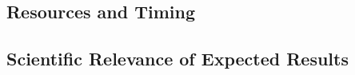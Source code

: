 \documentclass[11pt]{article}
\begin{document}
\subsubsection{}

\subsubsection{}


\newpage
\subsection{}
\label{}


\subsection{Resources and Timing}




\subsection{Scientific Relevance of Expected Results}
\noindent






\end{document}
